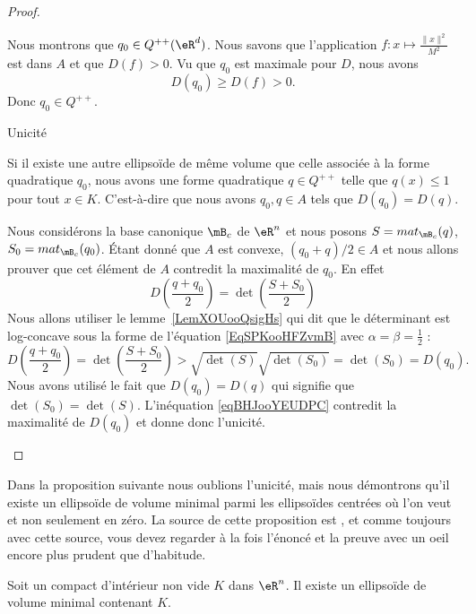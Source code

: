 \begin{proof}
\begin{subproof}
		Nous montrons que \( q_0\in Q^{++}(\eR^d)\). Nous savons que l'application \( f\colon x\mapsto \frac{ \| x \|^2 }{ M^2 }\) est dans \( A\) et que \( D(f)>0\). Vu que \( q_0\) est maximale pour \( D\), nous avons
		\begin{equation}
			D(q_0)\geq D(f)>0.
		\end{equation}
		Donc \( q_0\in Q^{++}\).

		\item[Unicité]

		Si il existe une autre ellipsoïde de même volume que celle associée à la forme quadratique \( q_0\), nous avons une forme quadratique \( q\in Q^{++}\) telle que \( q(x)\leq 1\) pour tout \( x\in K\). C'est-à-dire que nous avons \( q_0,q\in A\) tels que \( D(q_0)=D(q)\).

		Nous considérons la base canonique \( \mB_c\) de \( \eR^n\) et nous posons \( S=mat_{\mB_c}(q)\), \( S_0=mat_{\mB_c}(q_0)\). Étant donné que \( A\) est convexe, \( (q_0+q)/2\in A\) et nous allons prouver que cet élément de \( A\) contredit la maximalité de \( q_0\). En effet
		\begin{equation}
			D\left( \frac{ q+q_0 }{ 2 }\right)=\det\left( \frac{ S+S_0 }{2} \right)
		\end{equation}
		Nous allons utiliser le lemme~\ref{LemXOUooQsigHs} qui dit que le déterminant est log-concave sous la forme de l'équation \eqref{EqSPKooHFZvmB} avec \( \alpha=\beta=\frac{ 1 }{2}\) :
		\begin{equation}    \label{eqBHJooYEUDPC}
			D\left( \frac{ q+q_0 }{ 2 }\right)=\det\left( \frac{ S+S_0 }{2} \right)>\sqrt{\det(S)}\sqrt{\det(S_0)}=\det(S_0)=D(q_0).
		\end{equation}
		Nous avons utilisé le fait que \( D(q_0)=D(q)\) qui signifie que \( \det(S_0)=\det(S)\). L'inéquation \eqref{eqBHJooYEUDPC} contredit la maximalité de \( D(q_0)\) et donne donc l'unicité.
	\end{subproof}
\end{proof}

Dans la proposition suivante nous oublions l'unicité, mais nous démontrons qu'il existe un ellipsoïde de volume minimal parmi les ellipsoïdes centrées où l'on veut et non seulement en zéro. La source de cette proposition est \cite{MonCerveau}, et comme toujours avec cette source, vous devez regarder à la fois l'énoncé et la preuve avec un oeil encore plus prudent que d'habitude.
\begin{proposition}      \label{PROPooVIDPooOGrRJh}
	Soit un compact d'intérieur non vide \( K\) dans \( \eR^n\). Il existe un ellipsoïde de volume minimal contenant \( K\).
\end{proposition}

